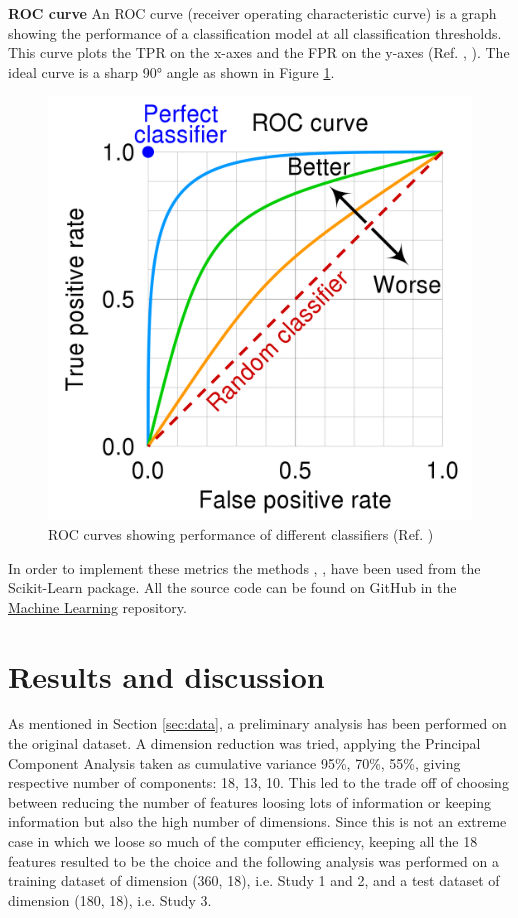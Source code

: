 \documentclass[english,notitlepage,reprint,nofootinbib]{revtex4-1}  %
\begin{document}
\textbf{ROC curve} An ROC curve (receiver operating characteristic curve) is a graph showing the performance of a classification model at all classification thresholds. This curve plots the TPR on the x-axes and the FPR on the y-axes (Ref. \cite{mortens}, \cite{roc}). The ideal curve is a sharp 90° angle as shown in Figure \ref{fig:roc}.

 \begin{figure}[h]
    \centering 
    \includegraphics[scale=0.15]{img/Roc_curve.png}
    \caption{ROC curves showing performance of different classifiers (Ref. \cite{roc_fig})}
    \label{fig:roc}
\end{figure}

In order to implement these metrics the methods , ,  have been used from the Scikit-Learn package. All the source code can be found on GitHub in the \href{https://github.com/adelezaini/MachineLearning/tree/master/Projects/Project3}{Machine Learning} repository.


\section{Results and discussion}\label{sec:results}

As mentioned in Section \ref{sec:data}, a preliminary analysis has been performed on the original dataset. A dimension reduction was tried, applying the Principal Component Analysis taken as cumulative variance 95\%, 70\%, 55\%, giving respective number of components: 18, 13, 10. This led to the trade off of choosing between reducing the number of features loosing lots of information or keeping information but also the high number of dimensions. Since this is not an extreme case in which we loose so much of the computer efficiency, keeping all the 18 features resulted to be the choice and the following analysis was performed on a training dataset of dimension (360, 18), i.e. Study 1 and 2, and a test dataset of dimension (180, 18), i.e. Study 3.
\end{document}
